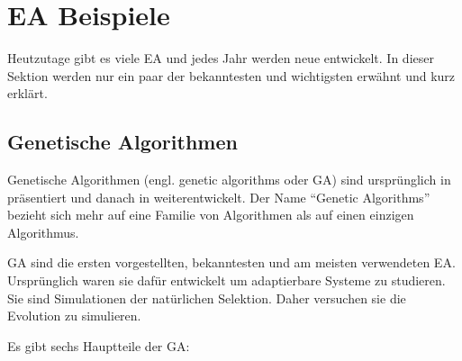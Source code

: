 \documentclass[twoside,twocolumn]{article}
\begin{document}

\section{EA Beispiele}
Heutzutage gibt es viele EA und jedes Jahr werden neue entwickelt. In dieser Sektion werden nur ein paar der bekanntesten und wichtigsten erwähnt und kurz erklärt.

\subsection{Genetische Algorithmen}
Genetische Algorithmen (engl. genetic algorithms oder GA) sind ursprünglich in \cite{holland_ga} präsentiert und danach in \cite{goldberg_ga} weiterentwickelt. Der Name \enquote{Genetic Algorithms} bezieht sich mehr auf eine Familie von Algorithmen als auf einen einzigen Algorithmus.\par
GA sind die ersten vorgestellten, bekanntesten und am meisten verwendeten EA. Ursprünglich waren sie dafür entwickelt um adaptierbare Systeme zu studieren. Sie sind Simulationen der natürlichen Selektion. Daher versuchen sie die Evolution zu simulieren.\par
Es gibt sechs Hauptteile der GA:
\end{document}
